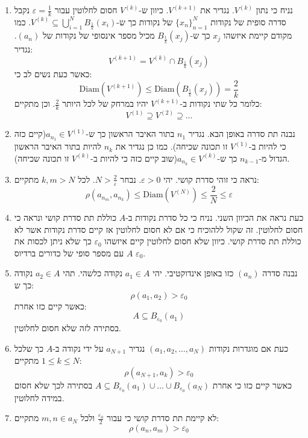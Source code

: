 \documentclass{tstextbook}
\begin{document}
\begin{enumerate}
  \item נניח כי נתון \(V^{(k)}\). נגדיר את \(V^{(k+1)}\). כיוון ש-\(V^{(k)}\) חסום לחלוטין עבור \(\varepsilon= \frac{1}{k}\) נקבל סדרה סופית של נקודות \(\{ x_{n} \}_{n=1}^{N}\) של נקודות כך ש-\(V^{(k)}\subseteq \bigcup_{i=1}^{N}B_{\frac{1}{k}}(x_{i})\). כמו מקודם קיימת איזשהו \(x_{j}\) כך ש-\(B_{\frac{1}{k}}(x_{j})\) מכיל מספר אינסופי של נקודות של \((a_{n})\). נגדיר: 
$$V^{(k+1)}=V^{(k)}\cap  B_{\frac{1}{k}}(x_{j})$$
כאשר כעת נשים לב כי:
$$\mathrm{Diam}(V^{(k+1)})\leq \mathrm{Diam}\left( B_{\frac{1}{k}}(x_{j}) \right)=\frac{2}{k}$$
כלומר כל שתי נקודות ב-\(V^{(k+1)}\) יהיו במרחק של לכל היותר \(\frac{2}{k}\). וכן מתקיים:
$$V^{(1)}\supseteq V^{(2)}\supseteq \dots$$


  \item נבנה תת סדרה באופן הבא. נגדיר \(n_{1}\) בתור האיבר הראשון כך ש-\(a_{n_{1}} \in V^{(1)}\)(קיים כזה כי להיות ב-\(V^{(1)}\) זו תכונה שכיחה). כמו כן נגדיר את \(n_{k}\) להיות בתור האיבר הראשון הגדול מ-\(n_{k-1}\) כך ש-\(a_{n_{k}}\in V^{(k)}\)(שוב קיים כזה כי להיות ב-\(V^{(k)}\) זו תכונה שכיחה).  


  \item נראה כי זוהי סדרת קושי. יהי \(\varepsilon> 0\). נבחר \(N>\frac{2}{\varepsilon}\). לכל \(k,m> N\) מתקיים: 
$$\rho(a_{n_{m}},a_{n_{k}})\leq  \mathrm{Diam}\left( V^{(N)} \right)\leq \frac{2}{N}\leq \varepsilon$$


  \item כעת נראה את הכיוון השני. נניח כי כל סדרת נקודות ב-\(A\) כוללת תת סדרת קושי ונראה כי חסום לחלוטין. זה שקול ללהוכיח כי אם לא חסום לחלוטין אז קיים סדרת נקודות אשר לא כוללת תת סדרת קושי. כיוון שלא חסום לחלוטין קיים איזשהו \(\varepsilon_{0}\) כך שלא ניתן לכסות את \(A\) עם מספר סופי של כדורים ברדיוס \(\varepsilon_{0}\). 


  \item נבנה סדרה \((a_{n})\) כזו באופן אינדוקטיבי. יהי \(a_{1} \in A\) נקודה כלשהי. תהי \(a_{2} \in A\) נקודה כך ש: 
$$\rho(a_{1},a_{2})>\varepsilon_{0}$$
כאשר קיים כזו אחרת:
$$A\subseteq B_{\varepsilon_{0}}(a_{1})$$
בסתירה לזה שלא חסום לחלוטין.


  \item כעת אם מוגדרות נקודות \((a_{1},a_{2},\dots,a_{N})\) נגדיר \(a_{N+1}\) על ידי נקודה ב-\(A\) כך שלכל \(1\leq k\leq N\) מתקיים: 
$$\rho(a_{N+1},a_{k})> \varepsilon_{0}$$
כאשר קיים כזו כי אחרת \(A\subseteq{ B_{\varepsilon_{0}}(a_{1}) }\cup \dots \cup {  B_{\varepsilon_{0}}(a_{N}) }\) בסתירה לכך שלא חסום במידה לחלוטין.


  \item לא קיימת תת סדרת קושי כי עבור \(\frac{\varepsilon_{0}}{2}\) ולכל \(m,n \in a_{N}\) מתקיים: 
$$\rho(a_{n},a_{m})>\varepsilon_{0}$$


\end{enumerate}
\end{document}
